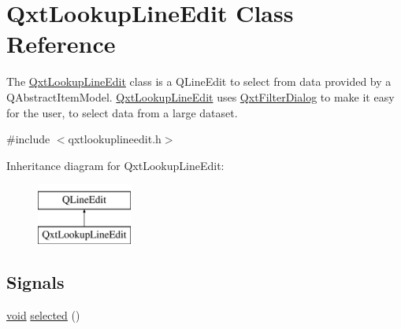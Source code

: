 \hypertarget{class_qxt_lookup_line_edit}{\section{Qxt\-Lookup\-Line\-Edit Class Reference}
\label{class_qxt_lookup_line_edit}
}


The \hyperlink{class_qxt_lookup_line_edit}{Qxt\-Lookup\-Line\-Edit} class is a Q\-Line\-Edit to select from data provided by a Q\-Abstract\-Item\-Model. \hyperlink{class_qxt_lookup_line_edit}{Qxt\-Lookup\-Line\-Edit} uses \hyperlink{class_qxt_filter_dialog}{Qxt\-Filter\-Dialog} to make it easy for the user, to select data from a large dataset.  




{\ttfamily \#include $<$qxtlookuplineedit.\-h$>$}

Inheritance diagram for Qxt\-Lookup\-Line\-Edit\-:\begin{figure}[H]
\begin{center}
\leavevmode
\includegraphics[height=2.000000cm]{class_qxt_lookup_line_edit}
\end{center}
\end{figure}
\subsection*{Signals}
\begin{DoxyCompactItemize}
\item 
\hyperlink{group___u_a_v_objects_plugin_ga444cf2ff3f0ecbe028adce838d373f5c}{void} \hyperlink{class_qxt_lookup_line_edit_abf34b50dee435b689fc0618e5e691926}{selected} ()
\end{DoxyCompactItemize}
